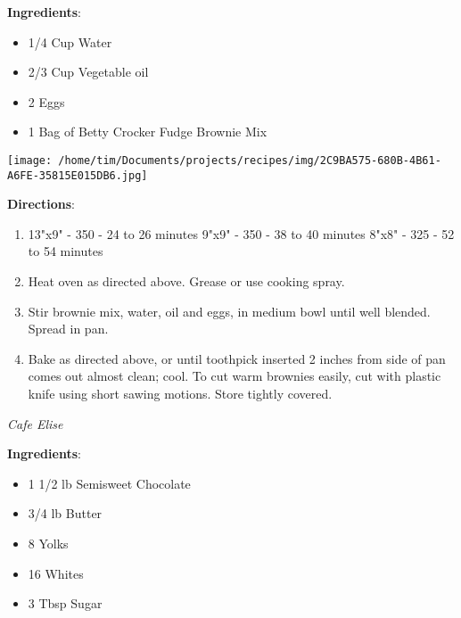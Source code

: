 \documentclass[11pt, twoside, openany]{book}
\begin{document}
\begin{minipage}[t]{0.8\linewidth}
\textbf{Ingredients}:\vspace{-3mm}
\begin{multicols}{2}
\begin{itemize}\setlength\itemsep{-1mm}
\item 1/4 Cup Water
\item 2/3 Cup Vegetable oil
\item 2 Eggs
\item 1 Bag of Betty Crocker Fudge Brownie Mix
\end{itemize}
\end{multicols}
\end{minipage}
\begin{minipage}[t]{0.2\linewidth}
\centering \strut\vspace*{-\baselineskip}\newline
\texttt{[image: /home/tim/Documents/projects/recipes/img/2C9BA575-680B-4B61-A6FE-35815E015DB6.jpg]}\\
\end{minipage}\vspace{3mm}
\textbf{Directions}:
\vspace{-3mm}\begin{enumerate}\setlength\itemsep{-1mm}
\item 13"x9" - 350 - 24 to 26 minutes
9"x9" - 350 - 38 to 40 minutes
8"x8" - 325 - 52 to 54 minutes
\item Heat oven as directed above. Grease or use cooking spray.
\item Stir brownie mix, water, oil and eggs, in medium bowl until well blended. Spread in pan.
\item Bake as directed above, or until toothpick inserted 2 inches from side of pan comes out almost clean; cool. To cut warm brownies easily, cut with plastic knife using short sawing motions. Store tightly covered.
\end{enumerate}
 \label{chocolate-mousse}\hfill\textit{Cafe Elise}\\
\begin{minipage}[t]{0.8\linewidth}
\textbf{Ingredients}:\vspace{-3mm}
\begin{multicols}{2}
\begin{itemize}\setlength\itemsep{-1mm}
\item 1 1/2 lb Semisweet Chocolate
\item 3/4 lb Butter
\item 8 Yolks
\item 16 Whites
\item 3 Tbsp Sugar
\end{itemize}
\end{multicols}
\end{minipage}
\end{document}
